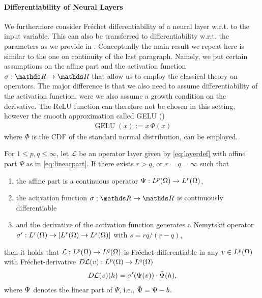 \paragraph{Differentiability of Neural Layers}
%
%
We furthermore consider Fréchet differentiability of a neural layer w.r.t. to the input variable. This can also be transferred to differentiability w.r.t. the parameters as we provide in \cite[Ex. 4]{kabri2023resolution}. Conceptually the main result we repeat here is similar to the one on continuity of the last paragraph. Namely, we put certain assumptions on the affine part and the activation function $\sigma:\R\to\R$ that allow us to employ the classical theory on \Nem{} operators. The major difference is that we also need to assume differentiability of the activation function, were we also assume a growth condition on the derivative. The ReLU function can therefore not be chosen in this setting, however the smooth approximation called GELU (\cite{hen16})
%
\begin{align*}
\operatorname{GELU}(x) := x\, \Phi(x)
\end{align*}
%
where $\Phi$ is the CDF of the standard normal distribution, can be employed.
%
%
\begin{proposition}{\cite[Prop. 2]{kabri2023resolution}}{}
	For $1 \leq p, q \leq \infty$, let $\mathcal{L}$ be an operator layer given by \eqref{eq:layerdef} with affine part $\Psi$ as in \eqref{eq:linearpart}. If there exists $r>q$, or $r = q = \infty$ such that
	\begin{enumerate}[label=(\roman*)]
		\item the affine part is a continuous operator $\Psi: L^p(\Omega) \rightarrow L^r(\Omega)$,
		\item the activation function $\sigma: \R \rightarrow \R$ is continuously differentiable
		\item and the derivative of the activation function generates a Nemytskii operator $\sigma': L^r(\Omega) \rightarrow \left[L^r(\Omega) \rightarrow L^{s}(\Omega) \right]$ with $s = {rq}/{(r-q)}$,
	\end{enumerate}
	then it holds that $\mathcal{L}:  L^p(\Omega) \rightarrow L^q(\Omega)$ is Fréchet-differentiable in any $v \in L^p(\Omega)$ with Fréchet-derivative $D\mathcal{L}(v): L^p(\Omega) \rightarrow L^q(\Omega)$
	\begin{align*}
		D\mathcal{L}(v)(h) = \sigma'(\Psi(v))\cdot\Tilde{\Psi}(h),
	\end{align*}
	where $\Tilde{\Psi}$ denotes the linear part of $\Psi$, i.e., $\Tilde{\Psi} = \Psi - b$.
\end{proposition}
%
%
